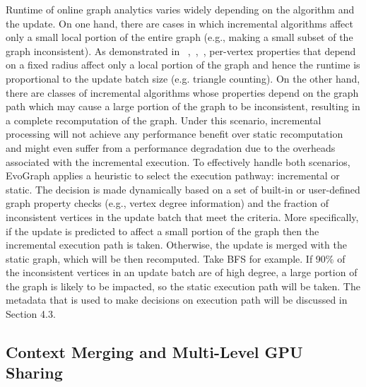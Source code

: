 Runtime of online graph analytics varies widely depending on the algorithm and the update. On one hand, there are cases in which incremental algorithms affect only a small local portion of the entire graph (e.g., making a small subset of the graph inconsistent). As demonstrated in ~\cite{CCof},~\cite{CC_new},~\cite{CC}, per-vertex properties that depend on a fixed radius affect only a local portion of the graph and hence the runtime is proportional to the update batch size (e.g. triangle counting). On the other hand, there are classes of incremental algorithms whose properties depend on the graph path which may cause a large portion of the graph to be inconsistent, resulting in a complete recomputation of the graph. Under this scenario, incremental processing will not achieve any performance benefit over static recomputation and might even suffer from a performance degradation due to the overheads associated with the incremental execution. To effectively handle both scenarios,  EvoGraph applies a heuristic to select the execution pathway: incremental or static.  The decision is made dynamically based on a set of built-in or user-defined graph property checks (e.g., vertex degree information) and the fraction of inconsistent vertices in the update batch that meet the criteria. More specifically, if the update is predicted to affect a small portion of the graph then the incremental execution path is taken. Otherwise, the update is merged with the static graph, which will be then recomputed.  Take BFS for example. If 90\% of the inconsistent vertices in an update batch are of high degree, a large portion of the graph is likely to be impacted, so the static execution path will be taken. The metadata that is used to make decisions on execution path will be discussed in Section 4.3.


\subsection{Context Merging and Multi-Level GPU Sharing}

